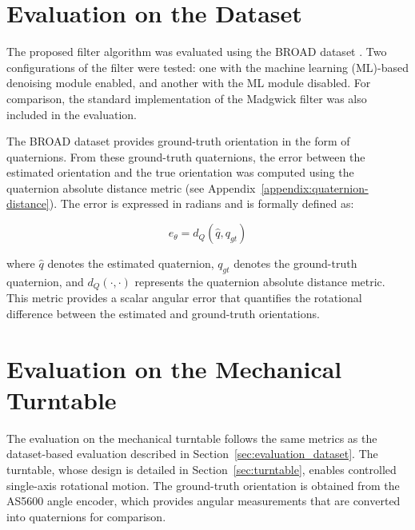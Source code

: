 \documentclass{iutbscthesis}
\begin{document}
\section{Evaluation on the Dataset}

The proposed filter algorithm was evaluated using the BROAD dataset \cite{BROAD}. Two configurations of the filter were tested: one with the machine learning (ML)-based denoising module enabled, and another with the ML module disabled. For comparison, the standard implementation of the Madgwick filter \cite{madgwick2011estimation} was also included in the evaluation.  

The BROAD dataset provides ground-truth orientation in the form of quaternions. From these ground-truth quaternions, the error between the estimated orientation and the true orientation was computed using the quaternion absolute distance metric (see Appendix~\ref{appendix:quaternion-distance}). The error is expressed in radians and is formally defined as:

\begin{equation}
    \label{eq:quat_error}
    e_{\theta} = d_{Q}\left(\hat{q}, q_{gt}\right)
\end{equation}

where $\hat{q}$ denotes the estimated quaternion, $q_{gt}$ denotes the ground-truth quaternion, and $d_{Q}(\cdot,\cdot)$ represents the quaternion absolute distance metric. This metric provides a scalar angular error that quantifies the rotational difference between the estimated and ground-truth orientations.

\section{Evaluation on the Mechanical Turntable}

The evaluation on the mechanical turntable follows the same metrics as the dataset-based evaluation described in Section~\ref{sec:evaluation_dataset}. The turntable, whose design is detailed in Section~\ref{sec:turntable}, enables controlled single-axis rotational motion. The ground-truth orientation is obtained from the AS5600 angle encoder, which provides angular measurements that are converted into quaternions for comparison.  
\end{document}
